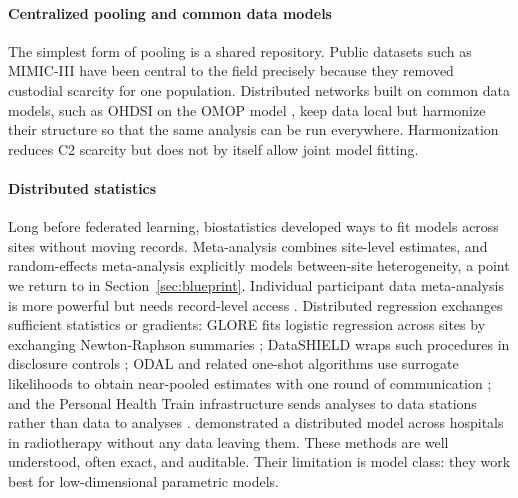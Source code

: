 \documentclass[acmsmall,screen,review]{acmart}
\theoremstyle{acmdefinition}
\begin{document}
\paragraph{Centralized pooling and common data models} The simplest form of pooling is a shared repository. Public datasets such as MIMIC-III \cite{johnson2016mimic} have been central to the field precisely because they removed custodial scarcity for one population. Distributed networks built on common data models, such as OHDSI on the OMOP model \cite{hripcsak2015observational,overhage2012validation}, keep data local but harmonize their structure so that the same analysis can be run everywhere. Harmonization reduces C2 scarcity but does not by itself allow joint model fitting.

\paragraph{Distributed statistics} Long before federated learning, biostatistics developed ways to fit models across sites without moving records. Meta-analysis combines site-level estimates, and random-effects meta-analysis \cite{dersimonian1986meta} explicitly models between-site heterogeneity, a point we return to in Section~\ref{sec:blueprint}. Individual participant data meta-analysis is more powerful but needs record-level access \cite{riley2010meta}. Distributed regression exchanges sufficient statistics or gradients: GLORE fits logistic regression across sites by exchanging Newton-Raphson summaries \cite{wu2012grid}; DataSHIELD wraps such procedures in disclosure controls \cite{gaye2014datashield}; ODAL and related one-shot algorithms use surrogate likelihoods to obtain near-pooled estimates with one round of communication \cite{duan2020learning,jordan2019communication}; and the Personal Health Train infrastructure sends analyses to data stations rather than data to analyses \cite{beyan2020distributed}. \citet{jochems2016distributed} demonstrated a distributed model across hospitals in radiotherapy without any data leaving them. These methods are well understood, often exact, and auditable. Their limitation is model class: they work best for low-dimensional parametric models.
\end{document}

